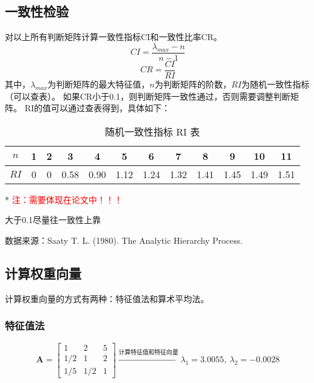 \documentclass[12pt,a4paper]{article} %
\begin{document}
\subsection{一致性检验}
对以上所有判断矩阵计算一致性指标CI和一致性比率CR。
\begin{equation}
CI = \frac{\lambda_{max} - n}{n - 1}
\end{equation}
\begin{equation}
CR = \frac{CI}{RI}
\end{equation}
其中，$\lambda_{max}$为判断矩阵的最大特征值，$n$为判断矩阵的阶数，$RI$为随机一致性指标（可以查表）。
如果CR小于0.1，则判断矩阵一致性通过，否则需要调整判断矩阵。
RI的值可以通过查表得到，具体如下：
\begin{table}[H]
    \centering
    \begin{threeparttable}
    \caption{随机一致性指标 RI 表}
    \begin{tabular}{c|ccccccccccc}
    \toprule %
    $n$ & 1 & 2 & 3 & 4 & 5 & 6 & 7 & 8 & 9 & 10 & 11 \\
    \midrule %
    $RI$ & 0 & 0 & 0.58 & 0.90 & 1.12 & 1.24 & 1.32 & 1.41 & 1.45 & 1.49 & 1.51 \\
    \bottomrule %
    \end{tabular}
    \begin{tablenotes}
            \small %
            \item[*] \textcolor{red}{注：需要体现在论文中！！！}
            \item[] 大于0.1尽量往一致性上靠
            \item[] 数据来源：Saaty T. L. (1980). The Analytic Hierarchy Process.
        \end{tablenotes}
    \end{threeparttable}
    \label{tab:ri_table}
\end{table}
\subsection{计算权重向量}
计算权重向量的方式有两种：特征值法和算术平均法。
\subsubsection{特征值法}
\[
\boldsymbol{A} = \begin{bmatrix}
1 & 2 & 5 \\
1/2 & 1 & 2 \\
1/5 & 1/2 & 1
\end{bmatrix}
\xrightarrow{\text{计算特征值和特征向量}} 
\lambda_1 = 3.0055,\ \lambda_2 = -0.0028
\]
\end{document}
